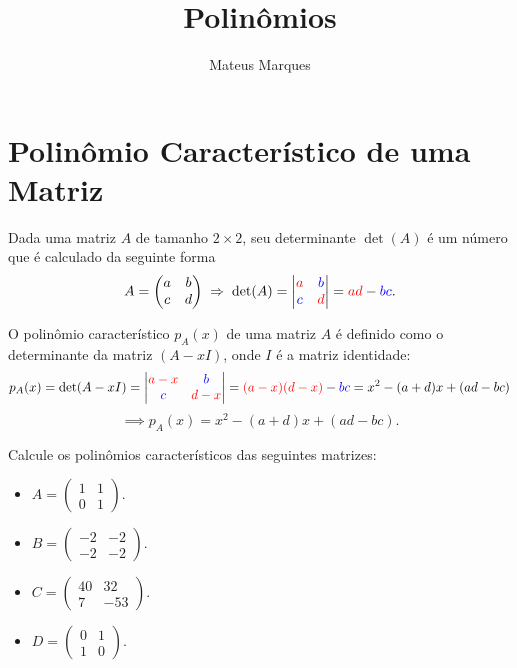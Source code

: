 \documentclass[a4paper,fleqn,12pt]{article}
\title{\Huge{\textbf{Polinômios}}}
\author{Mateus Marques}
\begin{document}
\maketitle

\section{Polinômio Característico de uma Matriz}


Dada uma matriz $A$ de tamanho $2 \times 2$, seu determinante $\det(A)$ é um número que é calculado da seguinte forma
$$
A =
\begin{pmatrix}
a & b \\
c & d
\end{pmatrix}
\implies
\det(A) =
\begin{vmatrix}
\textcolor{red}{a} & \textcolor{blue}{b} \\
\textcolor{blue}{c} & \textcolor{red}{d}
\end{vmatrix}
= \textcolor{red}{ad} - \textcolor{blue}{bc}.
$$

O polinômio característico $p_A(x)$ de uma matriz $A$ é definido como o determinante da matriz $(A - x I)$, onde $I$ é a matriz identidade:
$$
p_A(x) = \det(A - xI) =
\begin{vmatrix}
\textcolor{red}{a-x} & \textcolor{blue}{b} \\
\textcolor{blue}{c} & \textcolor{red}{d-x}
\end{vmatrix}
= \textcolor{red}{(a-x)(d-x)} - \textcolor{blue}{bc}
= x^2 - (a + d) x + (ad - bc)
$$
$$
\implies p_A(x) = x^2 - (a+d)x + (ad - bc).
$$


Calcule os polinômios característicos das seguintes matrizes:
\begin{itemize}
\item $\displaystyle{A = \begin{pmatrix} 1 & 1 \\ 0 & 1 \end{pmatrix}}$.
\item $\displaystyle{B = \begin{pmatrix} -2 & -2 \\ -2 & -2 \end{pmatrix}}$.
\item $\displaystyle{C = \begin{pmatrix} 40 & 32 \\ 7 & -53 \end{pmatrix}}$.
\item $\displaystyle{D = \begin{pmatrix} 0 & 1 \\ 1 & 0 \end{pmatrix}}$.
\end{itemize}
\end{document}
